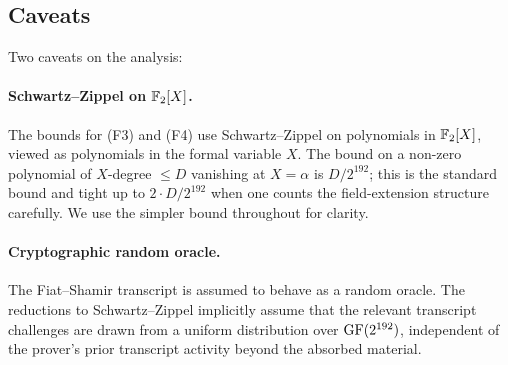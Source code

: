 \subsection{Caveats}

Two caveats on the analysis:

\paragraph{Schwartz–Zippel on $\mathbb{F}_2[X]$.} The bounds for (F3) and
(F4) use Schwartz–Zippel on polynomials in $\mathbb{F}_2[X]$, viewed as
polynomials in the formal variable $X$. The bound on a non-zero
polynomial of $X$-degree $\le D$ vanishing at $X = \alpha$ is
$D / 2^{192}$; this is the standard bound and tight up to
$2 \cdot D / 2^{192}$ when one counts the field-extension structure
carefully. We use the simpler bound throughout for clarity.

\paragraph{Cryptographic random oracle.} The Fiat–Shamir transcript
is assumed to behave as a random oracle. The reductions to
Schwartz–Zippel implicitly assume that the relevant transcript
challenges are drawn from a uniform distribution over $\mathrm{GF}(2^{192})$,
independent of the prover's prior transcript activity beyond the
absorbed material.
